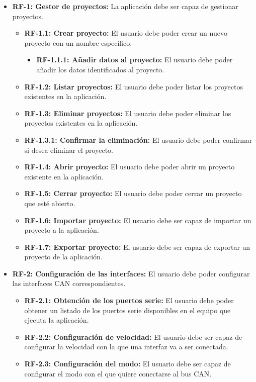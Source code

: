 \begin{itemize}
\item
\textbf{RF-1: Gestor de proyectos:} La aplicación debe ser capaz de gestionar proyectos.
\begin{itemize}
\item
\textbf{RF-1.1: Crear proyecto:} El usuario debe poder crear un nuevo proyecto con un nombre específico.
\begin{itemize}
\item
\textbf{RF-1.1.1: Añadir datos al proyecto:} El usuario debe poder añadir los datos identificados al proyecto.
\end{itemize}
\item
\textbf{RF-1.2: Listar proyectos:} El usuario debe poder listar los proyectos existentes en la aplicación.
\item
\textbf{RF-1.3: Eliminar proyectos:} El usuario debe poder eliminar los proyectos existentes en la aplicación.
\item
\textbf{RF-1.3.1: Confirmar la eliminación:} El usuario debe poder confirmar si desea eliminar el proyecto.
\item
\textbf{RF-1.4: Abrir proyecto:} El usuario debe poder abrir un proyecto existente en la aplicación.
\item
\textbf{RF-1.5: Cerrar proyecto:} El usuario debe poder cerrar un proyecto que esté abierto.
\item
\textbf{RF-1.6: Importar proyecto:} El usuario debe ser capaz de importar un proyecto a la aplicación.
\item
\textbf{RF-1.7: Exportar proyecto:} El usuario debe ser capaz de exportar un proyecto de la aplicación.
\end{itemize}
\item
\textbf{RF-2: Configuración de las interfaces:} El usuario debe poder configurar las interfaces CAN correspondientes.
\begin{itemize}
\item
\textbf{RF-2.1: Obtención de los puertos serie:} El usuario debe poder obtener un listado de los puertos serie disponibles en el equipo que ejecuta la aplicación.
\item
\textbf{RF-2.2: Configuración de velocidad:} El usuario debe ser capaz de configurar la velocidad con la que una interfaz va a ser conectada.
\item
\textbf{RF-2.3: Configuración del modo:} El usuario debe ser capaz de configurar el modo con el que quiere conectarse al bus CAN.
\end{itemize}

\end{itemize}
